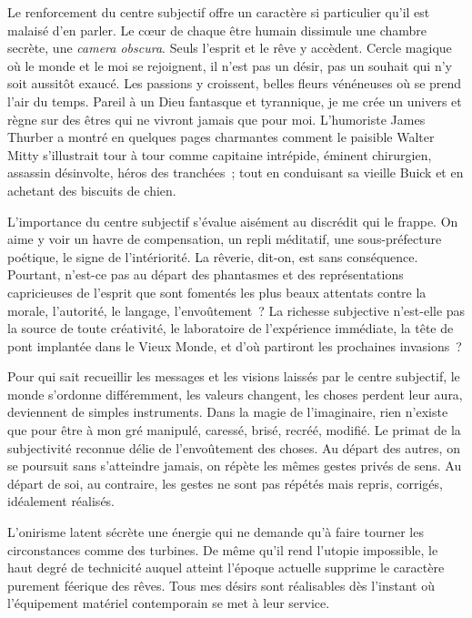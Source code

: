 \documentclass[french,twoside]{book} %
\begin{document}
Le renforcement du centre subjectif offre un caractère si particulier qu’il est malaisé d’en parler. Le cœur de chaque être humain dissimule une chambre secrète, une \emph{camera obscura}. Seuls l’esprit et le rêve y accèdent. Cercle magique où le monde et le moi se rejoignent, il n’est pas un désir, pas un souhait qui n’y soit aussitôt exaucé. Les passions y croissent, belles fleurs vénéneuses où se prend l’air du temps. Pareil à un Dieu fantasque et tyrannique, je me crée un univers et règne sur des êtres qui ne vivront jamais que pour moi. L’humoriste James Thurber a montré en quelques pages charmantes comment le paisible Walter Mitty s’illustrait tour à tour comme capitaine intrépide, éminent chirurgien, assassin désinvolte, héros des tranchées ; tout en conduisant sa vieille Buick et en achetant des biscuits de chien.\par
L’importance du centre subjectif s’évalue aisément au discrédit qui le frappe. On aime y voir un havre de compensation, un repli méditatif, une sous-préfecture poétique, le signe de l’intériorité. La rêverie, dit-on, est sans conséquence. Pourtant, n’est-ce pas au départ des phantasmes et des représentations capricieuses de l’esprit que sont fomentés les plus beaux attentats contre la morale, l’autorité, le langage, l’envoûtement ? La richesse subjective n’est-elle pas la source de toute créativité, le laboratoire de l’expérience immédiate, la tête de pont implantée dans le Vieux Monde, et d’où partiront les prochaines invasions ?\par
Pour qui sait recueillir les messages et les visions laissés par le centre subjectif, le monde s’ordonne différemment, les valeurs changent, les choses perdent leur aura, deviennent de simples instruments. Dans la magie de l’imaginaire, rien n’existe que pour être à mon gré manipulé, caressé, brisé, recréé, modifié. Le primat de la subjectivité reconnue délie de l’envoûtement des choses. Au départ des autres, on se poursuit sans s’atteindre jamais, on répète les mêmes gestes privés de sens. Au départ de soi, au contraire, les gestes ne sont pas répétés mais repris, corrigés, idéalement réalisés.\par
L’onirisme latent sécrète une énergie qui ne demande qu’à faire tourner les circonstances comme des turbines. De même qu’il rend l’utopie impossible, le haut degré de technicité auquel atteint l’époque actuelle supprime le caractère purement féerique des rêves. Tous mes désirs sont réalisables dès l’instant où l’équipement matériel contemporain se met à leur service.\par
\end{document}
